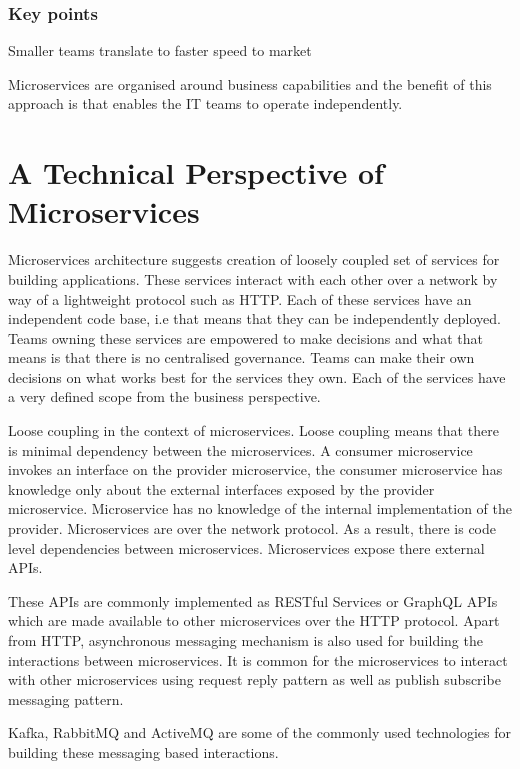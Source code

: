 \subsubsection{Key points}
\begin{note}
    \item Smaller teams translate to faster speed to market
    \item Microservices are organised around business capabilities and the benefit of this approach is that enables the IT teams to operate independently.
\end{note}


\section{A Technical Perspective of Microservices}

Microservices architecture suggests creation of loosely coupled set of services for building applications.
These services interact with each other over a network by way of a lightweight protocol such as HTTP\@.
Each of these services have an independent code base, i.e that means that they can be independently deployed.
Teams owning these services are empowered to make decisions and what that means is that there is no centralised governance.
Teams can make their own decisions on what works best for the services they own.
Each of the services have a very defined scope from the business perspective.

Loose coupling in the context of microservices.
Loose coupling means that there is minimal dependency between the microservices.
A consumer microservice invokes an interface on the provider microservice, the consumer microservice has knowledge only about the external interfaces exposed by the provider microservice.
Microservice has no knowledge of the internal implementation of the provider.
Microservices are over the network protocol.
As a result, there is code level dependencies between microservices.
Microservices expose there external APIs.

These APIs are commonly implemented as RESTful Services or GraphQL APIs which are made available to other microservices over the HTTP protocol.
Apart from HTTP, asynchronous messaging mechanism is also used for building the interactions between microservices.
It is common for the microservices to interact with other microservices using request reply pattern as well as publish subscribe messaging pattern.

Kafka, RabbitMQ and ActiveMQ are some of the commonly used technologies for building these messaging based interactions.

